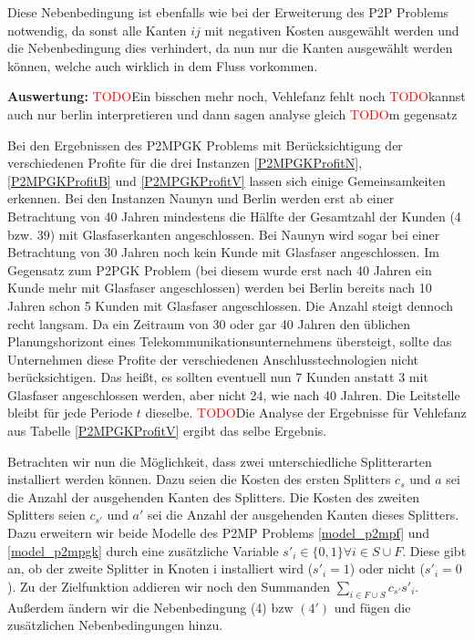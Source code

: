 \documentclass[11pt,a4paper]{article}
\newcommand{\TODO}{\textcolor{red}{TODO}}
\theoremstyle{my_th_style1}
\begin{document}
Diese Nebenbedingung ist ebenfalls wie bei der Erweiterung des P2P Problems notwendig, da sonst alle Kanten $ij$ mit negativen Kosten ausgewählt werden und die Nebenbedingung dies verhindert, da nun nur die Kanten ausgew\"ahlt werden können, welche auch wirklich in dem Fluss vorkommen.
 
 \textbf{Auswertung:} \TODO Ein bisschen mehr noch, Vehlefanz fehlt noch
 \TODO kannst auch nur berlin interpretieren und dann sagen analyse gleich
 \TODO m gegensatz
 
 Bei den Ergebnissen des P2MPGK Problems mit Ber\"ucksichtigung der verschiedenen Profite f\"ur die drei Instanzen \eqref{P2MPGKProfitN}, \eqref{P2MPGKProfitB} und \eqref{P2MPGKProfitV} lassen sich einige Gemeinsamkeiten erkennen.
 Bei den Instanzen Naunyn und Berlin werden erst ab einer Betrachtung von 40 Jahren mindestens die H\"alfte der Gesamtzahl der Kunden (4 bzw. 39) mit Glasfaserkanten angeschlossen.
 Bei Naunyn wird sogar bei einer Betrachtung von 30 Jahren noch kein Kunde mit Glasfaser angeschlossen.
 Im Gegensatz zum P2PGK Problem (bei diesem wurde erst nach 40 Jahren ein Kunde mehr mit Glasfaser angeschlossen) werden bei Berlin bereits nach 10 Jahren schon 5 Kunden mit Glasfaser angeschlossen. Die Anzahl steigt dennoch recht langsam. Da ein Zeitraum von 30 oder gar 40 Jahren den \"ublichen Planungshorizont eines Telekommunikationsunternehmens \"ubersteigt, sollte das Unternehmen diese Profite der verschiedenen Anschlusstechnologien nicht ber\"ucksichtigen.  Das heißt, es sollten eventuell nun 7 Kunden anstatt 3 mit Glasfaser angeschlossen werden, aber nicht 24, wie nach 40 Jahren. Die Leitstelle bleibt für jede Periode $t$ dieselbe.
 \TODO Die Analyse der Ergebnisse für Vehlefanz aus Tabelle \ref{P2MPGKProfitV} ergibt das selbe Ergebnis.
 
Betrachten wir nun die Möglichkeit, dass zwei unterschiedliche Splitterarten installiert werden können. Dazu seien die Kosten des ersten Splitters $c_s$ und $a$ sei die Anzahl der ausgehenden Kanten des Splitters. Die Kosten des zweiten Splitters seien $c_{s'}$ und $a'$ sei die Anzahl der ausgehenden Kanten dieses Splitters. Dazu erweitern wir beide Modelle des P2MP Problems \ref{model_p2mpf} und \ref{model_p2mpgk} durch eine zusätzliche Variable $s'_i \in \{0,1\} \forall i \in S\cup F$. Diese gibt an, ob der zweite Splitter in Knoten i installiert wird ($s'_i=1$) oder nicht ($s'_i=0$). Zu der Zielfunktion addieren wir noch den Summanden $\displaystyle\sum_{i \in F \cup S} c_{s'} s'_i$. Außerdem ändern wir die Nebenbedingung (4) bzw $(4')$ und fügen die zusätzlichen Nebenbedingungen hinzu.
\end{document}
